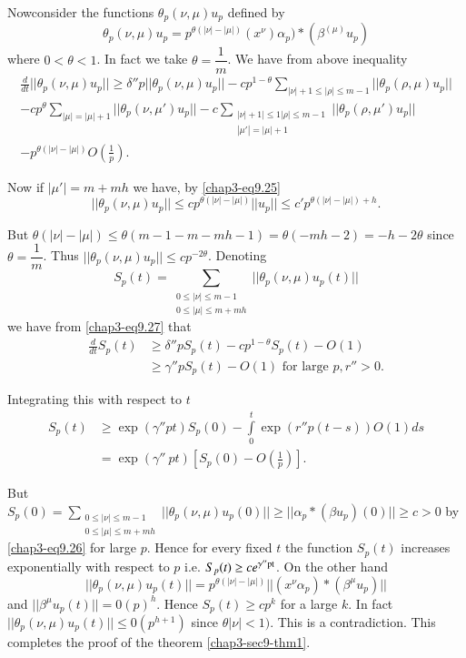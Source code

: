 Now\pageoriginale consider the functions $\theta_p(\nu, \mu) u_p$
defined by  
$$
\theta_p (\nu, \mu )u_p = p^{\theta(|\nu|-|\mu|)} (x^\nu)\alpha_p) *
(\beta^{(\mu)}u_p)  
$$
where $0<\theta<1$. In fact we take $\theta = \dfrac{1}{m}$. We
have from above inequality  
\begin{gather*}
\frac{d}{dt} || \theta_p (\nu, \mu ) u_p || \geq \delta '' p ||
\theta_p (\nu , \mu ) u_p || - cp^{1 - \theta}  \sum_{ |\nu| + 1 \leq
  |\rho| \leq m -1} || \theta_p (\rho , \mu )u_p || \\ 
  -  c p^\theta \sum_{ |\mu | = |\mu | + 1 } || \theta _p (\nu , \mu'
  ) u_p || - c \sum_{\substack{|\nu | + 1 |\leq 1|\rho| \leq m-1\\ |\mu'| =
      |\mu|+1}}  || \theta _p (\rho , \mu') u_p || \\
  - p^{\theta (|\nu | - | \mu |)} O (\frac{1}{p}).
  \tag{9.27}\label{chap3-eq9.27} 
\end{gather*}

Now if $|\mu'| = m + mh $ we have, by \eqref{chap3-eq9.25}
$$
|| \theta_p (\nu , \mu ) u_p || \leq c p^{\theta(|\nu | - | \mu |)}
|| u _p || \leq c' p^{ \theta(|\nu| - |\mu |) + h}.  
$$

But $\theta (|\nu | - |\mu |) \leq \theta (m - 1- m - mh - 1) = \theta 
(-mh - 2) = - h - 2 \theta$ since $\theta = \dfrac{1}{m}$. Thus $||
\theta_p (\nu, \mu )u_p || \leq c p^{-2 \theta }$. Denoting  
$$
S_p (t) = \sum_{\substack{0 \leq | \nu | \leq m - 1  \\ 0 \leq | \mu
    | \leq m + mh} } || \theta_p (\nu, \mu ) u_p (t) ||  
$$
we have from \eqref{chap3-eq9.27} that 
\begin{align*}
\frac{d}{dt} S_p (t) & \geq  \delta''  p S_p (t) - c p ^{1 -\theta }
S_p (t) - O (1) \\ 
& \geq \gamma'' p S_p (t) - O (1) \text{ for large  }  p, r'' > 0.  
\end{align*}

Integrating this with respect to $t$ 
\begin{align*}
S_p (t) & \geq \exp (\gamma'' pt ) S_p(0)  - \int\limits^t_0 \exp (r''
p(t - s)) O (1) ds  \\  
& = \exp (\gamma'' ~ pt )  \left[ S_p (0) -
  O\left(\frac{1}{p}\right)\right].  
\end{align*}\pageoriginale

But $S_p (0) = \sum\limits_{\substack{0 \leq |\nu| \leq m - 1 \\ 0 \leq | \mu
    | \leq m + mh}}  ||  \theta_p (\nu,  \mu ) u_p (0) || \geq ||
\alpha_p * (\beta u_p) (0) || \geq c > 0$ by \eqref{chap3-eq9.26} 
for large
$p$. Hence for every fixed $t$ the function $S_p (t)$ increases
exponentially with respect to $p$ i.e. $S_p (t) \geq c e^{\gamma''{\rm
    pt}}$. On the other hand   
$$
|| \theta_p (\nu , \mu ) u_p (t) || = p^{\theta (|\nu| - |\mu|)} ||
(x^\nu \alpha_p) * (\beta^\mu u_p)||  
$$
and $|| \beta^\mu u_p (t) || = 0 (p)^h$. Hence $S_p (t) \geq c p^k $ 
for a large $k$. In fact $||\theta_p (\nu, \mu ) u_p (t) || \leq
0(p^{h +1 })$ since $\theta | \nu | < 1 )$. This is a
contradiction. This completes the proof of the theorem
\ref{chap3-sec9-thm1}.   
